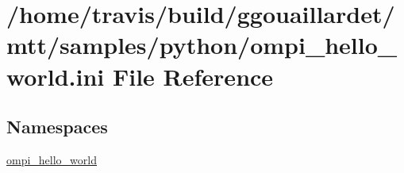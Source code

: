 \hypertarget{ompi__hello__world_8ini}{\section{/home/travis/build/ggouaillardet/mtt/samples/python/ompi\-\_\-hello\-\_\-world.ini File Reference}
\label{ompi__hello__world_8ini}
}
\subsection*{Namespaces}
\begin{DoxyCompactItemize}
\item 
\hyperlink{namespaceompi__hello__world}{ompi\-\_\-hello\-\_\-world}
\end{DoxyCompactItemize}

